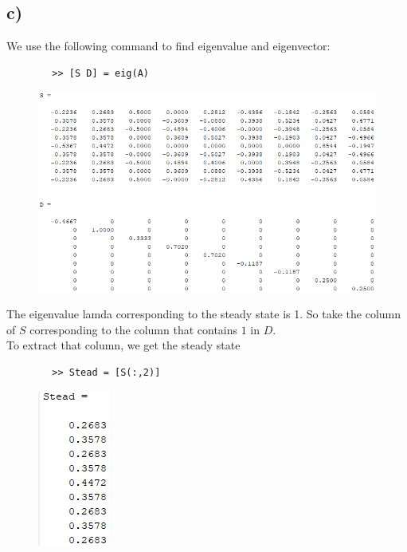 \documentclass[12pt,en,a4paper]{article}
\begin{document}
	\subsection*{c)}
	We use the following command to find eigenvalue and eigenvector:
	\begin{mdframed}[hidealllines=true,backgroundcolor=magenta!10]
		\begin{lstlisting}
		>> [S D] = eig(A)
		\end{lstlisting}
	\end{mdframed}
	\begin{figure}[H]
		\centering
		\includegraphics[scale=0.7]{prob1c.png}
		\label{prob1c}
	\end{figure}
	The eigenvalue lamda corresponding to the steady state is 1. So take the column of $S$ corresponding to the column that contains $1$ in $D$. \\
	To extract that column, we get the steady state
	\begin{mdframed}[hidealllines=true,backgroundcolor=magenta!10]
		\begin{lstlisting}
		>> Stead = [S(:,2)]
		\end{lstlisting}
	\end{mdframed}
	\begin{figure}[H]
		\centering
		\includegraphics*[scale=0.8]{prob1c1.png}
		\label{prob1c1}
	\end{figure}
	\newpage
\end{document}
